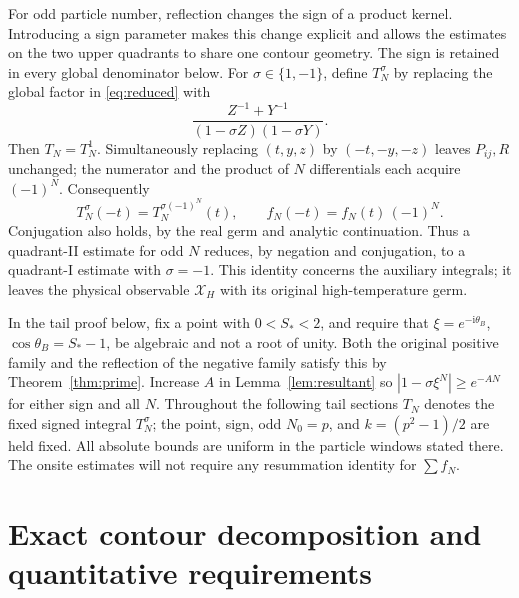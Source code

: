 \documentclass[11pt]{article}
\numberwithin{equation}{section}
\theoremstyle{definition}
\newcommand{\ii}{\mathrm i}
\begin{document}
For odd particle number, reflection changes the sign of a product
kernel. Introducing a sign parameter makes this change explicit and
allows the estimates on the two upper quadrants to share one contour
geometry. The sign is retained in every global denominator below.
For $\sigma\in\{1,-1\}$, define $T_N^\sigma$ by replacing
the global factor in \eqref{eq:reduced} with
\[
 \frac{Z^{-1}+Y^{-1}}{(1-\sigma Z)(1-\sigma Y)}.
\]
Then $T_N=T_N^1$. Simultaneously replacing
$(t,y,z)$ by $(-t,-y,-z)$ leaves $P_{ij},R$ unchanged;
the numerator and the product of $N$ differentials each acquire
$(-1)^N$. Consequently
\begin{equation}
 T_N^\sigma(-t)=T_N^{\sigma(-1)^N}(t),
 \qquad f_N(-t)=f_N(t)\,(-1)^N.
 \label{eq:signidentity}
\end{equation}
Conjugation also holds, by the real germ and analytic continuation.
Thus a quadrant-II estimate for odd $N$ reduces, by negation and
conjugation, to a quadrant-I estimate with $\sigma=-1$. This identity concerns the auxiliary integrals; it leaves the physical
observable $\mathcal X_H$ with its original high-temperature germ.

In the tail proof below, fix a point with $0<S_*<2$, and require
that $\xi=e^{-\ii\theta_B}$, $\cos\theta_B=S_*-1$, be algebraic
and not a root of unity. Both the original positive family and the
reflection of the negative family satisfy this by
Theorem~\ref{thm:prime}. Increase $A$ in Lemma~\ref{lem:resultant}
so $|1-\sigma\xi^N|\ge e^{-AN}$ for either sign and all $N$.
Throughout the following tail sections $T_N$ denotes the fixed
signed integral $T_N^\sigma$; the point, sign, odd $N_0=p$, and
$k=(p^2-1)/2$ are held fixed. All absolute bounds are uniform in
the particle windows stated there. The onsite estimates will not
require any resummation identity for $\sum f_N$.

\section{Exact contour decomposition and quantitative requirements}
\label{sec:tailreduction}
\end{document}
